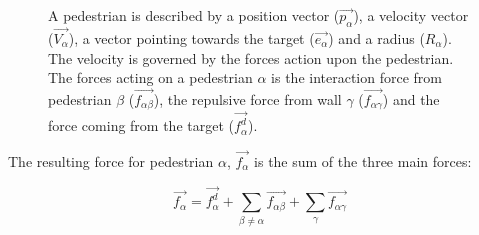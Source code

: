 \begin{figure}[ht]
    \centering
    \caption[Notation for pedestrians]{
     A pedestrian is described by a position
    vector ($ \overrightarrow{p_{\alpha}} $), a velocity vector ($
    \overrightarrow{V_{\alpha}} $), a vector pointing towards the target
    ($\overrightarrow{e_{\alpha}}$)  and a radius ($ R_{\alpha} $). The velocity is governed by the forces action upon the pedestrian.\\
     The forces acting on a pedestrian $\alpha$ is the
    interaction force from pedestrian $\beta$
    ($\overrightarrow{f_{\alpha\beta}}$), the repulsive force from wall $\gamma$
    ($\overrightarrow{f_{\alpha \gamma}}$) and the force coming from the target ($\overrightarrow{f^{d}_{\alpha}}$).}

    \label{pedestrian-notation}
\end{figure}

The resulting force for pedestrian $\alpha$, $\overrightarrow{f_{\alpha}}$ is
the sum of the three main forces:

\begin{equation}\label{model}
    \overrightarrow{f_{\alpha}} = \overrightarrow{f^{d}_{\alpha}} +
    \sum_{\beta \neq \alpha} \overrightarrow{f_{\alpha \beta}} +
    \sum_{\gamma} \overrightarrow{f_{\alpha \gamma}}
\end{equation}

